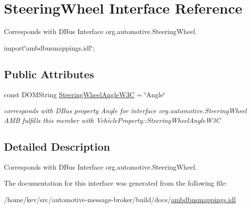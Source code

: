 \hypertarget{interfaceSteeringWheel}{\section{Steering\+Wheel Interface Reference}
\label{interfaceSteeringWheel}
}


Corresponds with D\+Bus Interface org.\+automotive.\+Steering\+Wheel.  




{\ttfamily import\char`\"{}ambdbusmappings.\+idl\char`\"{};}

\subsection*{Public Attributes}
\begin{DoxyCompactItemize}
\item 
\hypertarget{interfaceSteeringWheel_ae97a606756309f61df6d5fa62fc60705}{const D\+O\+M\+String \hyperlink{interfaceSteeringWheel_ae97a606756309f61df6d5fa62fc60705}{Steering\+Wheel\+Angle\+W3\+C} = \char`\"{}Angle\char`\"{}}\label{interfaceSteeringWheel_ae97a606756309f61df6d5fa62fc60705}

\begin{DoxyCompactList}\small\item\em corresponds with D\+Bus property Angle for interface org.\+automotive.\+Steering\+Wheel A\+M\+B fulfills this member with Vehicle\+Property\+::\+Steering\+Wheel\+Angle\+W3\+C \end{DoxyCompactList}\end{DoxyCompactItemize}


\subsection{Detailed Description}
Corresponds with D\+Bus Interface org.\+automotive.\+Steering\+Wheel. 

The documentation for this interface was generated from the following file\+:\begin{DoxyCompactItemize}
\item 
/home/kev/src/automotive-\/message-\/broker/build/docs/\hyperlink{ambdbusmappings_8idl}{ambdbusmappings.\+idl}\end{DoxyCompactItemize}
